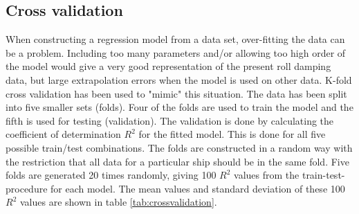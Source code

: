 \subsection{Cross validation}
\label{se:cross_validation}
When constructing a regression model from a data set, over-fitting the data can be a problem. Including too many parameters and/or allowing too high order of the model would give a very good representation of the present roll damping data, but large extrapolation errors when the model is used on other data. K-fold cross validation has been used to "mimic" this situation. The data has been split into five smaller sets (folds). Four of the folds are used to train the model and the fifth is used for testing (validation). The validation is done by calculating the coefficient of determination $R^2$ for the fitted model. This is done for all five possible train/test combinations. 
The folds are constructed in a random way with the restriction that all data for a particular ship should be in the same fold. Five folds are generated 20 times randomly, giving 100 $R^2$ values from the train-test-procedure for each model. The mean values and standard deviation of these 100 $R^2$ values are shown in table \ref{tab:crossvalidation}.




